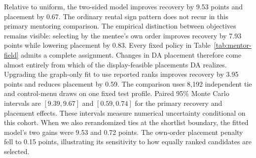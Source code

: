 Relative to uniform, the two-sided model improves recovery by 9.53 points and placement by 0.67. The ordinary rental sign pattern does not recur in this primary mentoring comparison. The empirical distinction between objectives remains visible: selecting by the mentee's own order improves recovery by 7.93 points while lowering placement by 0.83. Every fixed policy in Table~\ref{tab:mentor-field} admits a complete assignment. Changes in DA placement therefore come almost entirely from which of the display-feasible placements DA realizes. Upgrading the graph-only fit to use reported ranks improves recovery by 3.95 points and reduces placement by 0.59. The comparison uses 8,192 independent tie and control-menu draws on one fixed test profile. Paired 95\% Monte Carlo intervals are $[9.39,9.67]$ and $[0.59,0.74]$ for the primary recovery and placement effects. These intervals measure numerical uncertainty conditional on this cohort. When we also rerandomized ties at the shortlist boundary, the fitted model's two gains were 9.53 and 0.72 points. The own-order placement penalty fell to 0.15 points, illustrating its sensitivity to how equally ranked candidates are selected.
